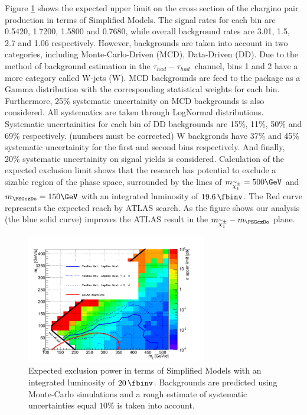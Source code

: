 Figure \ref{fig:limit_final} shows the expected upper limit on the cross section of the chargino pair production in terms of Simplified Models. 
The signal rates for each bin are 0.5420, 1.7200, 1.5800 and 0.7680, 
while overall background rates are 3.01, 1.5, 2.7 and 1.06 respectively.
However, backgrounds are taken into account in two categories, including Monte-Carlo-Driven (MCD), Data-Driven (DD).
Due to the method of background estimation in the $\tau_{had}-\tau_{had}~$ channel, bins 1 and 2 have a more category called W-jets (W).    
MCD backgrounds are feed to the package as a Gamma distribution with the corresponding statistical weights for each bin.
Furthermore, 25\% systematic uncertainity on MCD backgrounds is also considered.
All systematics are taken through LogNormal distributions.
Systematic uncertainities for each bin of DD backgrounds are 15\%, 11\%, 50\% and 69\% respectively. (numbers must be corrected)  
W backgronds have 37\% and 45\% systematic uncertainity for the first and second bins respectively.
And finally, 20\% systematic uncertainity on signal yields is considered. 
Calculation of the expected exclusion limit shows that the research has potential to exclude 
a sizable region of the phase space, surrounded by the lines of $m_{\PSGcpmDo} = 500\GeV$ and $m_{\PSGczDo} = 150\GeV$ with an integrated luminosity of $19.6\,\fbinv$.
The Red curve represents the expected reach by ATLAS %
 search. As the figure shows our analysis (the blue solid curve) improves the ATLAS result in the $m_{\PSGcpmDo}-m_{\PSGczDo}$ plane.

\begin{linenomath}
\begin{figure}[h]
\centering
\includegraphics[width=0.7\textwidth,keepaspectratio=true]{StatisticsFig/NewFigs/Final_4BinRel.png}
\caption{Expected exclusion power in terms of Simplified Models %
with an integrated luminosity of $20\,\fbinv$. Backgrounds are predicted using Monte-Carlo simulations and a rough estimate of systematic uncertainties equal 
$10\%$ is taken into account.}
\label{fig:limit_final}
\end{figure}
\end{linenomath}



